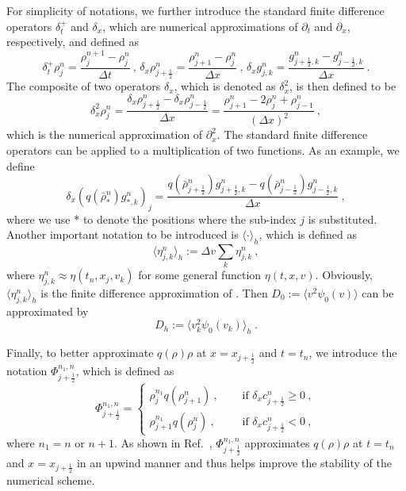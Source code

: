 \documentclass[review,onefignum,onetabnum]{siamart220329}
\newcommand{\beq}{\begin{equation}}
\newcommand{\eeq}{\end{equation}}
\begin{document}
For simplicity of notations, we further introduce 
the standard finite difference operators $\delta_t^+$ and $\delta_x$, which are numerical approximations of $\partial_t$ and  $\partial_x$, respectively, and defined as 
\begin{equation*}
    \delta_t^+ \rho_j^n = \frac{\rho_j^{n+1} - \rho_j^n}{\Delta t}\ , \, 
    \delta_x \rho_{j+\frac12}^n = \frac{\rho_{j+1}^n - \rho_{j}^n}{\Delta x}\ , \,
    \delta_x g_{j,k}^n = \frac{g_{j+\frac12,k}^n - g_{j-\frac12,k}^n}{\Delta x}\ . 
\end{equation*}
The composite of two operators $\delta_x$, which is denoted as $\delta_x^2$, is then defined to be 
\begin{equation*}
    \delta_x^2 \rho_j^n = \frac{\delta_x \rho_{j+\frac12}^n - \delta_x \rho_{j-\frac12}^n}{\Delta x}= \frac{\rho_{j+1}^n - 2\rho_{j}^n + \rho_{j-1}^n}{(\Delta x)^2}\ , 
\end{equation*}
which is the numerical approximation of $\partial_x^2$.
The standard finite difference operators can be applied to a multiplication of two functions. 
As an example, we define
\begin{equation*}
    \delta_x (q(\bar{\rho}_*^n) g_{*,k}^n)_j = \frac{q(\bar{\rho}_{j+\frac12}^n) g_{j+\frac12,k}^n - q(\bar{\rho}_{j-\frac12}^n) g_{j-\frac12, k}^n}{\Delta x}\ ,
\end{equation*}
where we use * to denote the positions where the sub-index $j$ is substituted. 
Another important notation to be introduced is $\langle\cdot\rangle_h$, which is defined as  
\begin{equation*}
     \langle\eta^n_{j,k}\rangle_h := \Delta v \sum_k \eta_{j,k}^n\ ,
\end{equation*}
where $\eta_{j,k}^n\approx\eta(t_n, x_j, v_k)$ for some general function $\eta(t,x,v)$. 
Obviously, $\langle\eta^n_{j,k}\rangle_h$ is the finite difference approximation of {}.
Then $D_0:=\langle v^2\psi_0(v)\rangle$ can be approximated by 
\begin{equation}\label{def:Dh}
    D_h := \langle v_k^2\psi_{0}(v_k)\rangle_h\ .
\end{equation}

\noindent Finally, to better approximate $q(\rho)\rho$ at $x=x_{j+\frac12}$ and $t=t_n$, 
we introduce the notation $\Phi^{n_1,n}_{j+\frac12}$, which is defined as 
\beq \label{def:Phi}
	\Phi^{n_1,n}_{j+\frac12} = 
	\begin{cases}
		\rho_j^{n_1} q(\rho_{j+1}^n)\ , \quad & \text{ if } \delta_x c_{j+\frac12}^n \ge 0\ , \\
		\rho_{j+1}^{n_1} q(\rho_j^n)\ , \quad & \text{ if } \delta_x c_{j+\frac12}^n <0\ ,
	\end{cases}
\eeq
where $n_1 = n$ or $n+1$.
As shown in Ref.~\cite{de2018energy}, $\Phi^{n_1,n}_{j+\frac12}$ approximates $q(\rho)\rho$ at $t=t_n$ and  $x=x_{j+\frac12}$  
in an upwind manner and thus helps improve the stability of the numerical scheme. 
\end{document}

